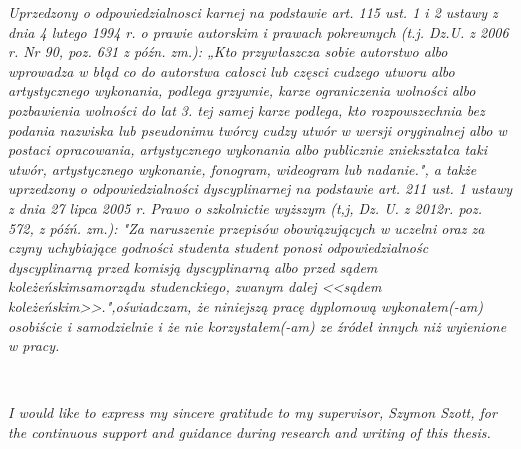 
\textit{
Uprzedzony o odpowiedzialnosci karnej na podstawie art. 115 ust. 1 i 2 
ustawy z dnia 4 lutego 1994 r. o prawie autorskim i prawach pokrewnych
(t.j. Dz.U. z 2006 r. Nr 90, poz. 631 z późn. zm.): „Kto przywłaszcza sobie autorstwo albo wprowadza w błąd co do autorstwa całosci lub częsci cudzego utworu albo artystycznego wykonania, podlega grzywnie, karze ograniczenia 
wolności albo pozbawienia wolności do lat 3. tej samej karze podlega, kto rozpowszechnia bez podania nazwiska lub pseudonimu twórcy cudzy utwór w wersji oryginalnej albo w postaci opracowania, artystycznego wykonania albo publicznie zniekształca taki utwór, artystycznego wykonanie, fonogram, wideogram lub nadanie.", a także uprzedzony o odpowiedzialności dyscyplinarnej na podstawie art. 211 ust. 1 ustawy z dnia 27 lipca 2005 r. Prawo o szkolnictie wyższym (t,j, Dz. U. z 2012r. poz. 572, z późń. zm.):
"Za naruszenie przepisów obowiązujących w uczelni oraz za czyny uchybiające godności studenta student ponosi odpowiedzialnośc dyscyplinarną przed komisją dyscyplinarną albo przed sądem koleżeńskimsamorządu studenckiego, zwanym dalej <<sądem koleżeńskim>>.",oświadczam, że niniejszą pracę dyplomową wykonałem(-am) osobiście i samodzielnie i że nie korzystałem(-am) ze źródeł innych niż wyienione w pracy.
}

\thispagestyle{empty}
\vspace{10in}


\thispagestyle{empty}
\
\vfill

\begin{flushright}

\begin{minipage}{0.65\textwidth}

\textit{I would like to express my sincere gratitude to my
supervisor, Szymon Szott, for the continuous support and guidance during research and writing of this thesis.}\\

\raggedleft \ \\[0.2cm]
\
\end{minipage}

\end{flushright}



